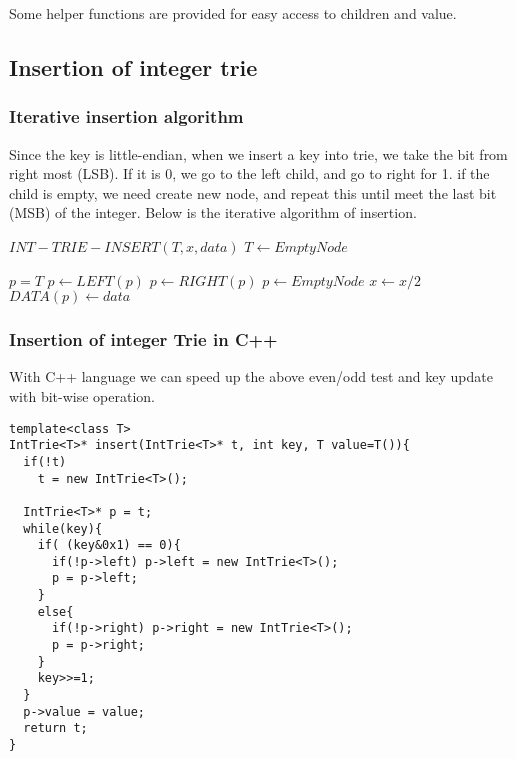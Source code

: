 \documentclass{article}
\begin{document}
Some helper functions are provided for easy access to children and value.

\subsection{Insertion of integer trie}

\subsubsection{Iterative insertion algorithm}
Since the key is little-endian, when we insert a key into trie, we take the
bit from right most (LSB). If it is 0, we go to the left child, and go to right
for 1. if the child is empty, we need create new node, and repeat this until
meet the last bit (MSB) of the integer. Below is the iterative algorithm
of insertion.

\begin{algorithmic}
\STATE $INT-TRIE-INSERT(T, x, data)$
   \STATE $T \leftarrow EmptyNode$ \ENDIF

  \STATE $p=T$
      \STATE $p \leftarrow LEFT(p)$
    \ELSE
      \STATE $p \leftarrow RIGHT(p)$
    \ENDIF
      \STATE $p \leftarrow EmptyNode$ \ENDIF
    \STATE $x \leftarrow x/2$
  \ENDWHILE
  \STATE $DATA(p) \leftarrow data$
\end{algorithmic}

\subsubsection*{Insertion of integer Trie in C++}
With C++ language we can speed up the above even/odd test and key update with
bit-wise operation.

\lstset{language=C++}
\begin{lstlisting}
template<class T>
IntTrie<T>* insert(IntTrie<T>* t, int key, T value=T()){
  if(!t)
    t = new IntTrie<T>();

  IntTrie<T>* p = t;
  while(key){
    if( (key&0x1) == 0){
      if(!p->left) p->left = new IntTrie<T>();
      p = p->left;
    }
    else{
      if(!p->right) p->right = new IntTrie<T>();
      p = p->right;
    }
    key>>=1;
  }
  p->value = value;
  return t;
}
\end{lstlisting}
\end{document}
